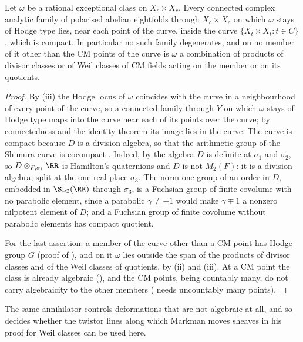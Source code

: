\begin{corollary}
\label{cor:nodegeneration}
Let $\omega$ be a rational exceptional class on $X_{c}\times X_{c}$. Every
connected complex analytic family of polarised abelian eightfolds through
$X_{c}\times X_{c}$ on which $\omega$ stays of Hodge type lies, near each
point of the curve, inside the curve $\{X_{t}\times X_{t}:t\in C\}$, which is
compact. In particular no such family degenerates, and on no member of it
other than the CM points of the curve is $\omega$ a combination of products
of divisor classes or of Weil classes of CM fields acting on the member or on
its quotients.
\end{corollary}

\begin{proof}
By (iii) the Hodge locus of $\omega$ coincides with the
curve in a neighbourhood of every point of the curve, so a connected family
through $Y$ on which $\omega$ stays of Hodge type maps into the curve near
each of its points over the curve; by connectedness and the identity theorem
its image lies in the curve. The curve is compact because $D$ is a division
algebra, so that the arithmetic group of the Shimura curve is cocompact
\cite{Mum69}. Indeed, by  the algebra $D$ is definite at
$\sigma_{1}$ and $\sigma_{2}$, so $D\otimes_{F,\sigma_{1}}\RR$ is Hamilton's
quaternions and $D$ is not $M_{2}(F)$: it is a division algebra, split at the
one real place $\sigma_{3}$. The norm one group of an order in $D$, embedded
in $\SL_{2}(\RR)$ through $\sigma_{3}$, is a Fuchsian group of finite
covolume with no parabolic element, since a parabolic $\gamma\ne\pm1$ would
make $\gamma\mp1$ a nonzero nilpotent element of $D$; and a Fuchsian group of
finite covolume without parabolic elements has compact quotient.

For the last assertion: a member of the curve other than a CM point has
Hodge group $G$ (proof of ), and on it $\omega$ lies
outside the span of the products of divisor classes and of the Weil classes
of quotients, by (ii) and (iii). At a CM point the
class is already algebraic (), and the CM points, being
countably many, do not carry algebraicity to the other members
( needs uncountably many points).
\end{proof}

The same annihilator controls deformations that are not algebraic at all,
and so decides whether the twistor lines along which Markman moves sheaves
in his proof for Weil classes can be used here.

